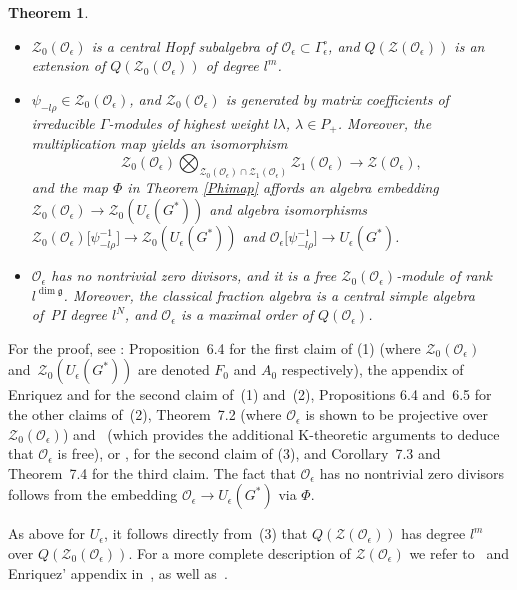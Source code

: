 \documentclass[10pt,a4paper]{amsart}
\numberwithin{equation}{section}
\newtheorem{teo}{Theorem}[section]
\theoremstyle{definition}
\newcommand{\e}{\epsilon}
\newcommand{\Oo}{{\mathcal O}}
\newcommand{\ra}{\rightarrow}
\begin{document}
\begin{teo} \label{DCLteo1} \quad
\begin{itemize}\itemsep=0pt
\item[$(1)$] $\mathcal{Z}_0(\Oo_\e)$ is a central Hopf subalgebra of $\Oo_\e\!\subset\! \Gamma_\e^\circ$, and $Q(\mathcal{Z}(\Oo_\e))$ is an extension of $Q(\mathcal{Z}_0(\Oo_\e))$ of degree $l^m$.
\item[$(2)$] $\psi_{-l\rho}\in \mathcal{Z}_0(\Oo_\e)$, and $\mathcal{Z}_0(\Oo_\e)$ is generated by matrix coefficients of irreducible $\Gamma$-modules of highest weight $l\lambda$, $\lambda\in P_+$. Moreover, the multiplication map yields an isomorphism
 \[
 \mathcal{Z}_0(\Oo_\e)\bigotimes_{\mathcal{Z}_0(\Oo_\e)\cap \mathcal{Z}_1(\Oo_\e)} \mathcal{Z}_1(\Oo_\e) \ra \mathcal{Z}(\Oo_\e),
 \]
 and the map $\Phi$ in Theorem {\rm\ref{Phimap}} affords an algebra embedding $\mathcal{Z}_0(\Oo_\e) \ra \mathcal{Z}_0(U_\e(G^*))$ and algebra isomorphisms $\mathcal{Z}_0(\Oo_\e)\big[\psi_{-l\rho}^{-1}\big] \ra \mathcal{Z}_0(U_\e(G^*))$ and $\Oo_\e\big[\psi_{-l\rho}^{-1}\big] \ra U_\e(G^*)$.
\item[$(3)$] $\Oo_\e$ has no nontrivial zero divisors, and it is a free $\mathcal{Z}_0(\Oo_\e)$-module of rank $l^{\dim \mathfrak{g}}$. Moreover, the classical fraction algebra \smash{$Q(\Oo_\e) = Q(\mathcal{Z}(\Oo_\e))\bigotimes_{\mathcal{Z}(\Oo_\e)} \Oo_\e$} is a central simple algebra of~PI degree $l^{N}$, and $\Oo_\e$ is a maximal order of $Q(\Oo_\e)$.
 \end{itemize}
\end{teo}
For the proof, see \cite{DC-L}: Proposition~6.4 for the first claim of (1) (where $\mathcal{Z}_0(\Oo_\e)$ and~$\mathcal{Z}_0(U_\e(G^*))$ are denoted $F_0$ and $A_0$ respectively), the appendix of Enriquez and \cite{Enr} for the second claim of~(1) and~(2), Propositions 6.4 and~6.5 for the other claims of~(2), Theorem~7.2 (where $\Oo_\e$ is shown to be projective over $\mathcal{Z}_0(\Oo_\e)$) and~\cite{BGS} (which provides the additional K-theoretic arguments to deduce that $\Oo_\e$ is free), or \cite[Remark~2.18\,(b)]{AnGa}, for the second claim of (3), and Corollary~7.3 and Theorem~7.4 for the third claim. The fact that $\Oo_\e$ has no nontrivial zero divisors follows from the embedding $\Oo_\e \ra U_\e(G^*)$ via $\Phi$.

As above for $U_\e$, it follows directly from~(3) that $Q(\mathcal{Z}(\Oo_\e))$ has degree $l^m$ over $Q(\mathcal{Z}_0(\Oo_\e))$. For a more complete description of $\mathcal{Z}(\Oo_\e)$ we refer to~\cite{Enr} and Enriquez' appendix in~\cite{DC-L}, as well as~\cite{BGOe}.
\end{document}

